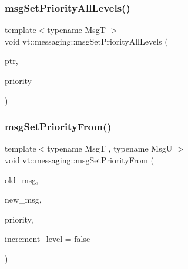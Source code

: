 \mbox{\label{namespacevt_1_1messaging_aae494e42c66a7b35346fd31d0100ebeb}} 
\subsubsection{\texorpdfstring{msg\+Set\+Priority\+All\+Levels()}{msgSetPriorityAllLevels()}}
{\footnotesize\ttfamily template$<$typename MsgT $>$ \\
void vt\+::messaging\+::msg\+Set\+Priority\+All\+Levels (\begin{DoxyParamCaption}\item[{MsgT}]{ptr,  }\item[{\hyperlink{namespacevt_a86bff9f556eb761b27fc8600d006ac04}{Priority\+Type}}]{priority }\end{DoxyParamCaption})}

\mbox{\label{namespacevt_1_1messaging_a9cbb4989b799eaba6ab9b8dde9e3cf14}} 
\subsubsection{\texorpdfstring{msg\+Set\+Priority\+From()}{msgSetPriorityFrom()}}
{\footnotesize\ttfamily template$<$typename MsgT , typename MsgU $>$ \\
void vt\+::messaging\+::msg\+Set\+Priority\+From (\begin{DoxyParamCaption}\item[{MsgT}]{old\+\_\+msg,  }\item[{MsgU}]{new\+\_\+msg,  }\item[{\hyperlink{namespacevt_a86bff9f556eb761b27fc8600d006ac04}{Priority\+Type}}]{priority,  }\item[{bool}]{increment\+\_\+level = {\ttfamily false} }\end{DoxyParamCaption})}

\mbox{\label{namespacevt_1_1messaging_ad71afa970305de275db8e91a5041d8e9}} 

